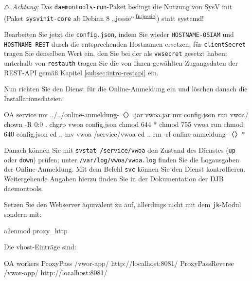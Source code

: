 ⚠ \emph{Achtung:} Das \texttt{daemontools-run}-Paket bedingt
die Nutzung von SysV init (Paket \texttt{sysvinit-core} ab Debian 8
„jessie“\Hair\textsuperscript{\ref{fn:jessie}}) statt systemd!

Bearbeiten Sie jetzt die \texttt{config.json}, indem Sie wieder
\texttt{HOSTNAME-OSIAM} und \texttt{HOSTNAME-REST} durch die
entsprechenden Hostnamen ersetzen; für \texttt{clientSecret}
tragen Sie denselben Wert ein, den Sie bei der
 als \texttt{vwsecret}
gesetzt haben; unterhalb von \texttt{restauth} tragen Sie die
von Ihnen gewählten Zugangsdaten der REST-API gemäß Kapitel
\ref{subsec:intro-restapi} ein.

\begin{minipage}{\textwidth}
Nun richten Sie den Dienst für die Online-Anmeldung ein und
löschen danach die Installationsdateien:

\begin{lstdump}{OA service}
mv ../../online-anmeldung-〈\lstdumpesc{\vwiaverssw}〉.jar vwoa.jar
mv config.json run vwoa/
chown -R 0:0 .
chgrp vwoa config.json
chmod 644 *
chmod 755 vwoa run
chmod 640 config.json
cd ..
mv vwoa /service/vwoa
cd ..
rm -rf online-anmeldung-〈\lstdumpesc{\vwiaverssw}〉*
\end{lstdump}
\end{minipage}

Danach können Sie mit \texttt{svstat /service/vwoa} den Zustand
des Dienstes (\texttt{up} oder \texttt{down}) prüfen; unter
\texttt{/var/log/vwoa/vwoa.log} finden Sie die Logausgaben der
Online-Anmeldung. Mit dem Befehl \texttt{svc} können Sie den Dienst
kontrollieren. Weitergehende Angaben hierzu finden Sie in der
Dokumentation der DJB daemontools.

\begin{minipage}{\textwidth}
Setzen Sie den Webserver äquivalent zu 
auf, allerdings nicht mit dem \texttt{jk}-Modul sondern mit:

\begin{lstdumpx}
a2enmod proxy_http
\end{lstdumpx}
\end{minipage}

\begin{minipage}{\textwidth}
Die vhost-Einträge sind:

\begin{lstdump}{OA workers}
ProxyPass /vwor-app/ http://localhost:8081/
ProxyPassReverse /vwor-app/ http://localhost:8081/
\end{lstdump}
\end{minipage}

